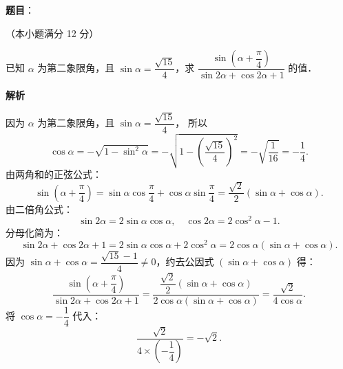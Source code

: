 \begin{answer}

\textbf{题目}：

（本小题满分 12 分）

已知 $\alpha$ 为第二象限角，且 $\sin\alpha=\dfrac{\sqrt{15}}{4}$，求 $\dfrac{\sin\left(\alpha+\dfrac{\pi}{4}\right)}{\sin 2\alpha+\cos 2\alpha+1}$ 的值．

\textbf{解析}

因为 $\alpha$ 为第二象限角，且 $\sin\alpha=\dfrac{\sqrt{15}}{4}$，
所以
\nopagebreak[4]
\[
\cos\alpha=-\sqrt{1-\sin^2\alpha}=-\sqrt{1-\left(\frac{\sqrt{15}}{4}\right)^2}=-\sqrt{\frac{1}{16}}=-\frac{1}{4}.
\]
由两角和的正弦公式：
\nopagebreak[4]
\[
\sin\left(\alpha+\frac{\pi}{4}\right)=\sin\alpha\cos\frac{\pi}{4}+\cos\alpha\sin\frac{\pi}{4}=\frac{\sqrt{2}}{2}(\sin\alpha+\cos\alpha).
\]
由二倍角公式：
\nopagebreak[4]
\[
\sin 2\alpha=2\sin\alpha\cos\alpha,\quad \cos 2\alpha=2\cos^2\alpha-1.
\]
分母化简为：
\nopagebreak[4]
\[
\sin 2\alpha+\cos 2\alpha+1=2\sin\alpha\cos\alpha+2\cos^2\alpha=2\cos\alpha(\sin\alpha+\cos\alpha).
\]
因为 $\sin\alpha+\cos\alpha=\dfrac{\sqrt{15}-1}{4}\neq 0$，约去公因式 $(\sin\alpha+\cos\alpha)$ 得：
\nopagebreak[4]
\[
\frac{\sin\left(\alpha+\dfrac{\pi}{4}\right)}{\sin 2\alpha+\cos 2\alpha+1}=\frac{\dfrac{\sqrt{2}}{2}(\sin\alpha+\cos\alpha)}{2\cos\alpha(\sin\alpha+\cos\alpha)}=\frac{\sqrt{2}}{4\cos\alpha}.
\]
将 $\cos\alpha=-\dfrac{1}{4}$ 代入：
\nopagebreak[4]
\[
\frac{\sqrt{2}}{4\times\left(-\dfrac{1}{4}\right)}=-\sqrt{2}.
\]


\end{answer}
